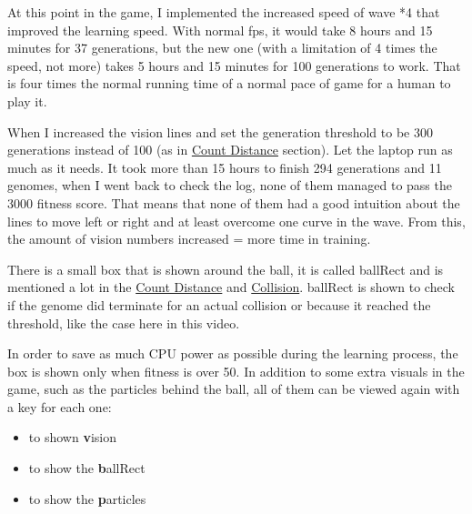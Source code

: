 At this point in the game, I implemented the increased speed of wave *4 that improved the learning speed. With normal fps, it would take 8 hours and 15 minutes for 37 generations, but the new one (with a limitation of 4 times the speed, not more) takes 5 hours and 15 minutes for 100 generations to work. That is four times the normal running time of a normal pace of game for a human to play it.

When I increased the vision lines and set the generation threshold to be 300 generations instead of 100 (as in \hyperref[sec:count-distance]{Count Distance} section). Let the laptop run as much as it needs. It took more than 15 hours to finish 294 generations and 11 genomes, when I went back to check the log, none of them managed to pass the 3000 fitness score. That means that none of them had a good intuition about the lines to move left or right and at least overcome one curve in the wave. From this, the amount of vision numbers increased = more time in training.

There is a small box that is shown around the ball, it is called ballRect and is mentioned a lot in the \hyperref[sec:count-distance]{Count Distance} and \hyperref[sec:collision]{Collision}. ballRect is shown to check if the genome did terminate for an actual collision or because it reached the threshold, like the case here in this video.

In order to save as much CPU power as possible during the learning process, the box is shown only when fitness is over 50. In addition to some extra visuals in the game, such as the particles behind the ball, all of them can be viewed again with a key for each one:
\begin{itemize}
	\item {} to shown \textbf{v}ision
	\item {} to show the \textbf{b}allRect
	\item {} to show the \textbf{p}articles
\end{itemize}